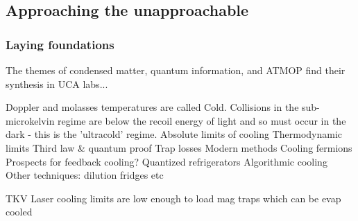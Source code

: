 \subsection*{Approaching the unapproachable} %
	\subsubsection{Laying foundations}
	The themes of condensed matter, quantum information, and ATMOP find their synthesis in UCA labs...

	Doppler and molasses temperatures are called Cold.
	Collisions in the sub-microkelvin regime are below the recoil energy of light and so must occur in the dark - this is the 'ultracold' regime.
	Absolute limits of cooling Thermodynamic limits Third law \& quantum	proof Trap losses Modern methods Cooling fermions Prospects for feedback	cooling? Quantized refrigerators Algorithmic cooling Other techniques:	dilution fridges etc
	
	TKV Laser cooling limits are low enough to load mag traps which can be evap cooled


